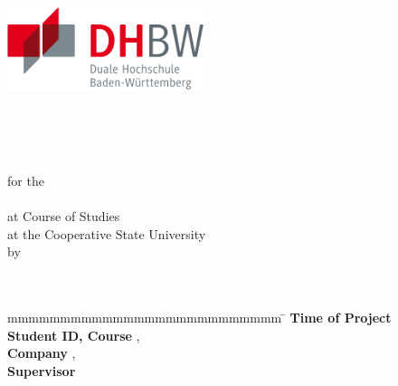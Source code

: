 \begin{titlepage}
    \pagestyle{plain}
	\begin{center}
	  \includegraphics[height=2.4cm]{./images/DHBW_Logo.png}
	\end{center}
	\enlargethispage{20mm}
	\begin{center}
	    \begin{spacing}{1.5}
	      \vspace*{5mm}	{\LARGE\bf \titel }\\
	      \vspace*{3mm}{\large \subtitel }\\
	    \end{spacing}
	 \end{center}
	 \begin{center}
	    \vspace*{5mm}	{\large\bf \arbeit}\\
        \vspace*{9mm}	for the\\
	    \vspace*{3mm} 	{\bf \abschluss}\\
	    \vspace*{12mm}	at Course of Studies \studiengang\\
	    \vspace*{1mm} 	at the Cooperative State University \dhbw\\
	    \vspace*{12mm}	by\\
	    \vspace*{3mm} 	{\large\bf \autor}\\
	    \vspace*{12mm}	\datumAbgabe\\
	\end{center}
	\vfill
	\begin{spacing}{1.2}
	    \begin{tabbing}
		    mmmmmmmmmmmmmmmmmmmmmmmmmm     \= \kill
		    \textbf{Time of Project}  \>  \zeitraum\\
		    \textbf{Student ID, Course}  \>  \matrikelnr, \kurs\\
		    \textbf{Company}      \>  \firma, \firmenort\\
		    \textbf{Supervisor}              \>  \betreuer
	    \end{tabbing}
	\end{spacing}
\end{titlepage}
